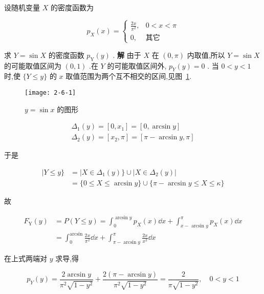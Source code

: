 \begin{example}\label{exam:2.6.4}
	设随机变量 $ X $ 的密度函数为
	
	\[
	p_{X}(x)=\left\{\begin{array}{ll}
	{\frac{2 x}{\pi^{2}},} & {0<x<\pi} \\ 
	{0,} & {\text{其它}}
	\end{array}\right.
	\]
	
	求 $ Y=\sin X $ 的密度函数 $ p_{\mathrm{Y}}(y) $ .
	\textbf{解} 由于 $ X $ 在 $ (0, \pi) $ 内取值,所以 $ Y=\sin X $ 的可能取值区间为 $ (0,1) $ .在 $ Y $ 的可能取值区间外, $ p_{Y}(y)=0 $ .
	当 $ 0<y<1 $ 时,使 $ \{ Y \leqslant y \} $ 的 $ x $ 取值范围为两个互不相交的区间,见图~\ref{fig:2.6.1}.
	
	\begin{figure}
		\centering
		\texttt{[image: 2-6-1]}
		\caption{ $ y=\sin x $ 的图形}
		\label{fig:2.6.1}
	\end{figure}
	
	\[
	\begin{array}{l}{\Delta_{1}(y)=\left[0, x_{1}\right]=[0, \arcsin y]} \\ {\Delta_{2}(y)=\left[x_{2}, \pi\right]=[\pi-\arcsin y, \pi]}\end{array}
	\]
	
	于是
	
	\[
	\begin{aligned} | Y \leqslant y \} &=| X \in \Delta_{1}(y) \} \cup\left|X \in \Delta_{2}(y)\right| \\ &=\{0 \leqslant X \leqslant \arcsin y\} \cup\{\pi-\arcsin y \leqslant X \leqslant \kappa\} \end{aligned}
	\]
	
	故
	
	\[
	\begin{array}{ll}
	{F_{\mathrm{Y}}(y)} & {=P(Y \leqslant y)=\int_{0}^{\arcsin y} p_{X}(x) \dd x+\int_{x-\text { arcsin } y}^{\pi} p_{X}(x) \dd x} \\ 
	{} & {=\int_{0}^{\arcsin } \frac{2 x}{\pi^{2}} \dd x+\int_{\pi-\arcsin y}^{\pi} \frac{2 x}{x^{2}} \dd x}
	\end{array}
	\]
	
	在上式两端对 $ y $ 求导,得
	
	\[
	p_{Y}(y)=\frac{2 \arcsin y}{\pi^{2} \sqrt{1-y^{2}}}+\frac{2(\pi-\arcsin y)}{\pi^{2} \sqrt{1-y^{2}}}=\frac{2}{\pi \sqrt{1-y^{2}}}, \quad 0<y<1
	\]
\end{example}

